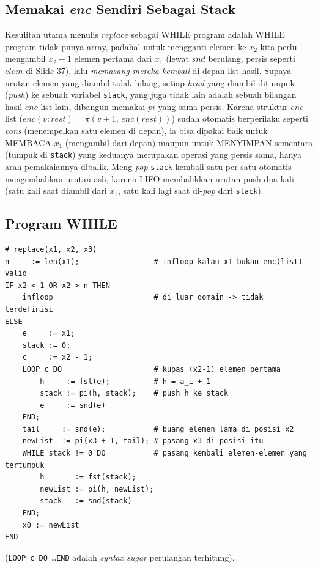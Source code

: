 \documentclass[12pt, a4paper, bahasa]{article}
\begin{document}
\subsection{Memakai \textit{enc} Sendiri Sebagai Stack}
Kesulitan utama menulis $replace$ sebagai WHILE program adalah WHILE
program tidak punya array, padahal untuk mengganti elemen ke-$x_2$ kita
perlu mengambil $x_2-1$ elemen pertama dari $x_1$ (lewat $snd$ berulang,
persis seperti $elem$ di Slide 37), lalu \emph{memasang mereka kembali} di depan list hasil. Supaya urutan elemen yang diambil tidak hilang, setiap \textit{head} yang diambil ditumpuk (\textit{push}) ke sebuah variabel \texttt{stack}, yang juga tidak lain adalah sebuah bilangan hasil $enc$
list lain, dibangun memakai $pi$ yang sama persis. Karena struktur $enc$
list ($enc(v{:}rest)=\pi(v{+}1,\,enc(rest))$) sudah otomatis berperilaku
seperti \textit{cons} (menempelkan satu elemen di depan), ia bisa dipakai
baik untuk MEMBACA $x_1$ (mengambil dari depan) maupun untuk MENYIMPAN sementara
(tumpuk di \texttt{stack}) yang keduanya merupakan operasi yang persis sama, hanya arah
pemakaiannya dibalik. Meng-\textit{pop} \texttt{stack} kembali satu
per satu otomatis mengembalikan urutan asli, karena LIFO membalikkan urutan
push dua kali (satu kali saat diambil dari $x_1$, satu kali lagi saat
di-\textit{pop} dari \texttt{stack}).

\subsection{Program WHILE}
\begin{lstlisting}
# replace(x1, x2, x3)
n     := len(x1);                 # infloop kalau x1 bukan enc(list) valid
IF x2 < 1 OR x2 > n THEN
    infloop                       # di luar domain -> tidak terdefinisi
ELSE
    e     := x1;
    stack := 0;
    c     := x2 - 1;
    LOOP c DO                     # kupas (x2-1) elemen pertama
        h     := fst(e);          # h = a_i + 1
        stack := pi(h, stack);    # push h ke stack
        e     := snd(e)
    END;
    tail     := snd(e);           # buang elemen lama di posisi x2
    newList  := pi(x3 + 1, tail); # pasang x3 di posisi itu
    WHILE stack != 0 DO           # pasang kembali elemen-elemen yang tertumpuk
        h       := fst(stack);
        newList := pi(h, newList);
        stack   := snd(stack)
    END;
    x0 := newList
END
\end{lstlisting}
(\texttt{LOOP c DO \dots END} adalah \textit{syntax sugar} perulangan terhitung).
\end{document}
